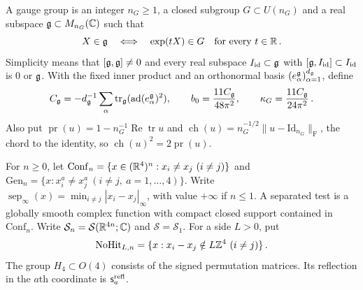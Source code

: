 \begin{definition}\label{def:gauge-group}
A gauge group is an integer $n_G\ge1$, a closed subgroup $G\subset U(n_G)$ and a real subspace $\mathfrak{g}\subset M_{n_G}(\mathbb{C})$ such that
\begin{equation}\label{eq:lie-algebra}
X\in\mathfrak{g}\quad\Longleftrightarrow\quad \exp(tX)\in G\quad\hbox{for every }t\in\mathbb{R}\,.
\end{equation}
Simplicity means that $[\mathfrak{g},\mathfrak{g}]\ne0$ and every real subspace $I_{\rm id}\subset\mathfrak{g}$ with $[\mathfrak{g},I_{\rm id}]\subset I_{\rm id}$ is $0$ or $\mathfrak{g}$. With the fixed inner product and an orthonormal basis $(e_\alpha^{\mathfrak{g}})_{\alpha=1}^{d_{\mathfrak{g}}}$, define
\begin{equation}\label{eq:casimir}
C_{\mathfrak{g}}=-d_{\mathfrak{g}}^{-1}\sum_\alpha\operatorname{tr}_{\mathfrak{g}}(\operatorname{ad}(e_\alpha^{\mathfrak{g}})^2),\qquad b_0=\frac{11C_{\mathfrak{g}}}{48\pi^2},\qquad \kappa_G=\frac{11C_{\mathfrak{g}}}{24\pi^2}\,.
\end{equation}
Also put $\operatorname{pr}(u)=1-n_G^{-1}\operatorname{Re}\operatorname{tr}u$ and $\operatorname{ch}(u)=n_G^{-1/2}\|u-\mathrm{Id}_{n_G}\|_{\mathrm F}$, the chord to the identity, so $\operatorname{ch}(u)^2=2\operatorname{pr}(u)$.
\end{definition}

\begin{definition}\label{def:configurations}
For $n\ge0$, let $\mathrm{Conf}_n=\{x\in(\mathbb{R}^4)^n:x_i\ne x_j\ (i\ne j)\}$ and $\mathrm{Gen}_n=\{x:x_i^a\ne x_j^a\ (i\ne j,\ a=1,\ldots,4)\}$. Write $\operatorname{sep}_\infty(x)=\min_{i\ne j}|x_i-x_j|_\infty$, with value $+\infty$ if $n\le1$. A separated test is a globally smooth complex function with compact closed support contained in $\mathrm{Conf}_n$. Write $\mathcal S_n=\mathcal S(\mathbb{R}^{4n};\mathbb{C})$ and $\mathcal S=\mathcal S_1$. For a side $L>0$, put
\begin{equation}\label{eq:nohit}
\mathrm{NoHit}_{L,n}=\{x:x_i-x_j\notin L\mathbb{Z}^4\ (i\ne j)\}\,.
\end{equation}
The group $H_4\subset O(4)$ consists of the signed permutation matrices. Its reflection in the $a$th coordinate is $\mathsf s_a^{\rm refl}$.
\end{definition}

